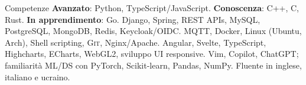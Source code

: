 

\begin{rubric}{Competenze}
	\small{\textbf{Avanzato}: Python, TypeScript/JavaScript. \textbf{Conoscenza}: C++, C, Rust. \textbf{In apprendimento}: Go.}
	\small {Django, Spring, REST APIs, MySQL, PostgreSQL, MongoDB, Redis, Keycloak/OIDC.}
%
	\small{MQTT, Docker, Linux (Ubuntu, Arch), Shell scripting, \textsc{Git}, Nginx/Apache.}
%
	\small{Angular, Svelte, TypeScript, Highcharts, ECharts, WebGL2, sviluppo UI responsive.}
%
	\small{Vim, Copilot, ChatGPT; familiarit\`a ML/DS con PyTorch, Scikit-learn, Pandas, NumPy.}
%
	\small {Fluente in inglese, italiano e ucraino.}
\end{rubric}

